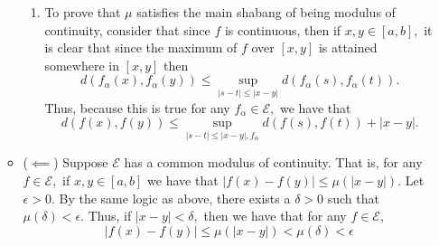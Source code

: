 \documentclass[11pt]{article}
\begin{document}
\begin{enumerate}
\begin{solution}
\begin{itemize}
\begin{enumerate}
            \item To prove that $\mu$ satisfies the main shabang of being modulus of continuity, consider that since $f$ is continuous, then if $x,y \in [a,b],$ it is clear that since the maximum of $f$ over $[x,y]$ is attained somewhere in $[x,y]$ then
            \[d(f_\alpha(x), f_\alpha(y)) \leq \sup_{|s-t|\leq |x-y|}d(f_\alpha(s), f_\alpha(t)).\] Thus, because this is true for any $f_\alpha \in \mathcal{E},$ we have that 
            \[d(f(x), f(y)) \leq \sup_{|s-t|\leq |x-y|, f_\alpha}d(f(s), f(t)) + |x-y|.\] 
            \end{enumerate}
            \item ($\impliedby$) Suppose $\mathcal{E}$ has a common modulus of continuity. That is, for any $f \in \mathcal{E},$ if $x,y \in [a,b]$ we have that $|f(x) - f(y)|\leq \mu(|x-y|).$ Let $\epsilon>0.$ By the same logic as above, there exists a $\delta>0$ such that $\mu(\delta) < \epsilon.$ Thus, if $|x-y|< \delta,$ then we have that for any $f\in \mathcal{E},$
            \[|f(x) - f(y)| \leq \mu(|x-y|)< \mu(\delta) < \epsilon\]
        \end{itemize}
    \end{solution}

\end{enumerate}
\newpage
\end{document}
